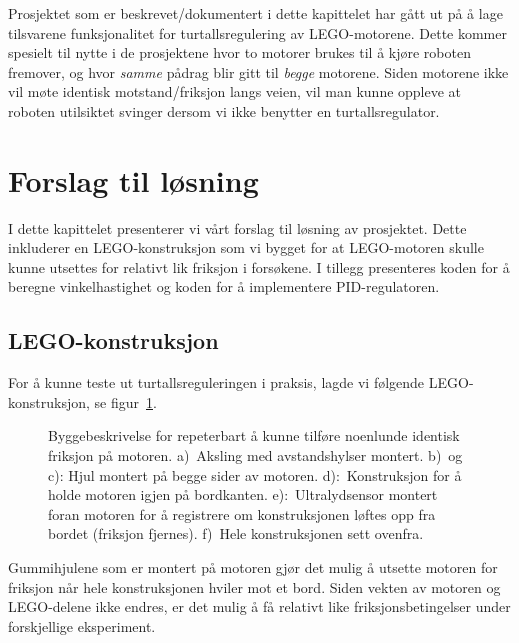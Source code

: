 Prosjektet som er beskrevet/dokumentert i dette kapittelet 
har gått ut på å lage 
tilsvarene funksjonalitet for turtallsregulering av LEGO-motorene. 
Dette kommer spesielt til nytte i de prosjektene hvor to motorer brukes til å
kjøre roboten fremover, 
og hvor {\em samme} pådrag blir gitt til {\em begge} motorene. Siden
motorene ikke vil møte identisk motstand/friksjon langs veien, vil man 
kunne oppleve at roboten utilsiktet svinger dersom vi ikke benytter en
turtallsregulator.


\section{Forslag til løsning}
I dette
kapittelet presenterer vi vårt forslag til løsning av prosjektet. Dette
inkluderer en LEGO-konstruksjon som vi bygget for at 
LEGO-motoren skulle kunne utsettes for relativt lik friksjon i
forsøkene. I tillegg presenteres koden for å beregne vinkelhastighet
og koden for å implementere PID-regulatoren. 

\subsection{LEGO-konstruksjon}
For
å kunne teste ut turtallsreguleringen i praksis, lagde vi
følgende LEGO-konstruksjon, se figur~\ref{fig:friksjon}. 
\begin{figure}[H]
  \centering
  \caption{Byggebeskrivelse for repeterbart å kunne 
    tilføre noenlunde identisk friksjon på motoren.  a)~Aksling med avstandshylser
    montert. b)~og c): Hjul montert
    på begge sider av motoren. d):~Konstruksjon for å holde motoren
    igjen på bordkanten. e):~Ultralydsensor montert foran motoren for
    å registrere om konstruksjonen løftes opp fra bordet (friksjon fjernes). 
    f)~Hele konstruksjonen sett ovenfra. 
     } 
  \label{fig:friksjon}
\end{figure}
Gummihjulene som er montert på motoren gjør det mulig å utsette
motoren for friksjon når hele konstruksjonen hviler mot et bord. 
Siden vekten av motoren og LEGO-delene ikke endres, er det mulig å få
relativt  like friksjonsbetingelser under forskjellige eksperiment. 

